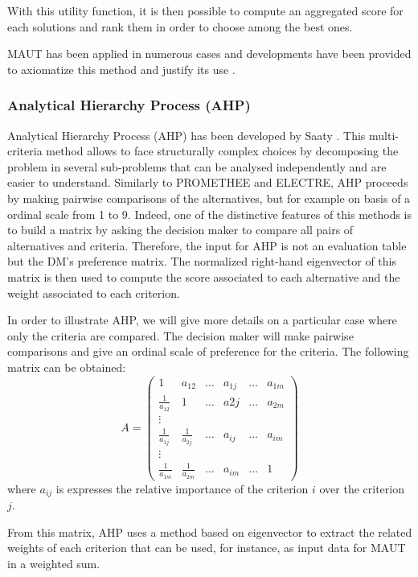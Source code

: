 With this utility function, it is then possible to compute an aggregated score for each solutions and rank them in order to choose among the best ones.

MAUT has been applied in numerous cases and developments have been provided to axiomatize this method and justify its use \cite{MMAUT}.

\subsubsection{Analytical Hierarchy Process (AHP)}
Analytical Hierarchy Process (AHP) has been developed by Saaty \cite{MAHP}. This multi-criteria method allows to face structurally complex choices by decomposing the problem in several sub-problems that can be analysed independently and are easier to understand. Similarly to PROMETHEE and ELECTRE, AHP proceeds by making pairwise comparisons of the alternatives, but for example on basis of a ordinal scale from 1 to 9. Indeed, one of the distinctive features of this methods is to build a matrix by asking the decision maker to compare all pairs of alternatives and criteria. Therefore, the input for AHP is not an evaluation table but the DM's preference matrix. The normalized right-hand eigenvector of this matrix is then used to compute the score associated to each alternative and the weight associated to each criterion. 

In order to illustrate AHP, we will give more details on a particular case where only the criteria are compared. The decision maker will make pairwise comparisons and give an ordinal scale of preference for the criteria. The following matrix can be obtained:
\begin{equation}
A=\begin{pmatrix}
1 & a_{12} & \dots & a_{1j} & \dots & a_{1m}\\
\frac{1}{a_{12}} & 1 & \dots & a{2j} & \dots & a_{2m}\\
\vdots \\
\frac{1}{a_{1j}} & \frac{1}{a_{2j}} & \dots & a_{ij} & \dots & a_{im}\\
\vdots \\
\frac{1}{a_{1m}} & \frac{1}{a_{2m}} & \dots & a_{im} & \dots & 1
\end{pmatrix}
\end{equation}
where $a_{ij}$ is expresses the relative importance of the criterion $i$ over the criterion $j$.

From this matrix, AHP uses a method based on eigenvector to extract the related weights of each criterion that can be used, for instance, as input data for MAUT in a weighted sum.

